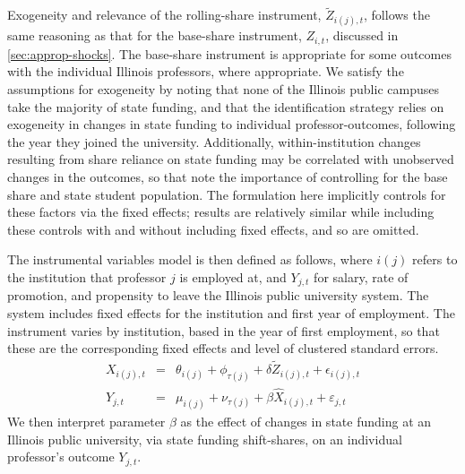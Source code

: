 Exogeneity and relevance of the rolling-share instrument, $\tilde Z_{i(j),t}$, follows the same reasoning as that for the base-share instrument, $Z_{i,t}$, discussed in \autoref{sec:approp-shocks}.
The base-share instrument is appropriate for some outcomes with the individual Illinois professors, where appropriate.
We satisfy the assumptions for exogeneity by noting that none of the Illinois public campuses take the majority of state funding, and that the identification strategy relies on exogeneity in changes in state funding to individual professor-outcomes, following the year they joined the university.
Additionally, within-institution changes resulting from share reliance on state funding may be correlated with unobserved changes in the outcomes, so that \cite{NBERw27885} note the importance of controlling for the base share and state student population.
The formulation here implicitly controls for these factors via the fixed effects; results are relatively similar while including these controls with and without including fixed effects, and so are omitted.

The instrumental variables model is then defined as follows, where $i(j)$ refers to the institution that professor $j$ is employed at, and $Y_{j,t}$ for salary, rate of promotion, and propensity to leave the Illinois public university system.
The system includes fixed effects for the institution and first year of employment.
The instrument varies by institution, based in the year of first employment, so that these are the corresponding fixed effects and level of clustered standard errors.
\begin{eqnarray}
    \label{eqn:secondstage1_indiv}
    X_{i(j),t} &=& \theta_{i(j)} + \phi_{\tau(j)} + \delta \tilde Z_{i(j),t} + \epsilon_{i(j),t} \\
    \label{eqn:secondstage2_indiv}
    Y_{j,t} &=& \mu_{i(j)} + \nu_{\tau(j)} + \beta \widehat X_{i(j),t} + \varepsilon_{j,t}
\end{eqnarray}
We then interpret parameter $\beta$ as the effect of changes in state funding at an Illinois public university, via state funding shift-shares, on an individual professor's outcome $Y_{j,t}$.

